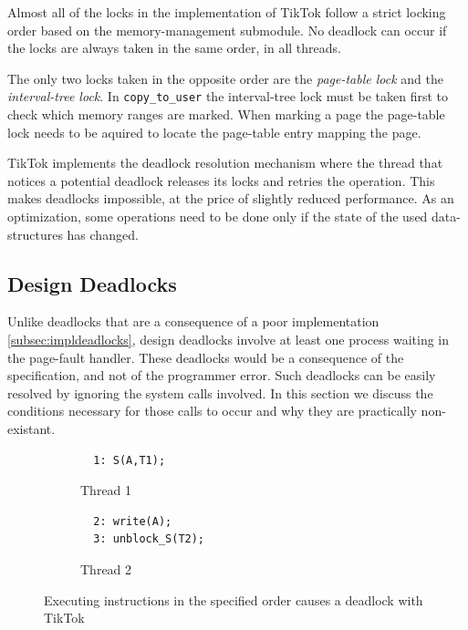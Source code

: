 \documentclass[conference]{IEEEtran}
\newcommand{\sysname}{TikTok}
\begin{document}
Almost all of the locks in the implementation of \sysname{} follow a strict locking
order based on the memory-management submodule. No deadlock can occur if the locks
are always taken in the same order, in all threads.

The only two locks taken in the opposite order are the \emph{page-table lock}
and the \emph{interval-tree lock}. In \texttt{copy\_to\_user} the interval-tree
lock must be taken first to check which memory ranges are marked. When marking a
page the page-table lock needs to be aquired to locate the page-table entry
mapping the page.

\sysname{} implements the deadlock resolution mechanism where the thread that
notices a potential deadlock releases its locks and retries the operation. This
makes deadlocks impossible, at the price of slightly reduced performance. As an
optimization, some operations need to be done only if the state of the used
data-structures has changed.

\subsection{Design Deadlocks}
\label{subsec:tiktokdeadlocks}
Unlike deadlocks that are a consequence of a poor implementation
\autoref{subsec:impldeadlocks}, design deadlocks involve at least one process
waiting in the page-fault handler. These deadlocks would be a consequence of the
specification, and not of the programmer error. Such deadlocks can be easily
resolved by ignoring the system calls involved. In this section we discuss the 
conditions necessary for those calls to occur and why they are practically
non-existant.

\begin{figure}
  \centering
  \begin{subfigure}[b]{0.45\linewidth}
  \begin{minipage}{\linewidth}
  \begin{lstlisting}
  1: S(A,T1);  
  \end{lstlisting}
  \end{minipage}
  \caption{Thread 1}
  \end{subfigure}
  \hfill
  \begin{subfigure}[b]{0.45\linewidth}
  \begin{minipage}{\linewidth}
  \begin{lstlisting}
  2: write(A);
  3: unblock_S(T2);
  \end{lstlisting}  
  \end{minipage}
  \caption{Thread 2}
  \end{subfigure}
  \caption{Executing instructions in the specified order causes a deadlock with \sysname}
  \label{fig:deadlock}
\end{figure}
\end{document}
